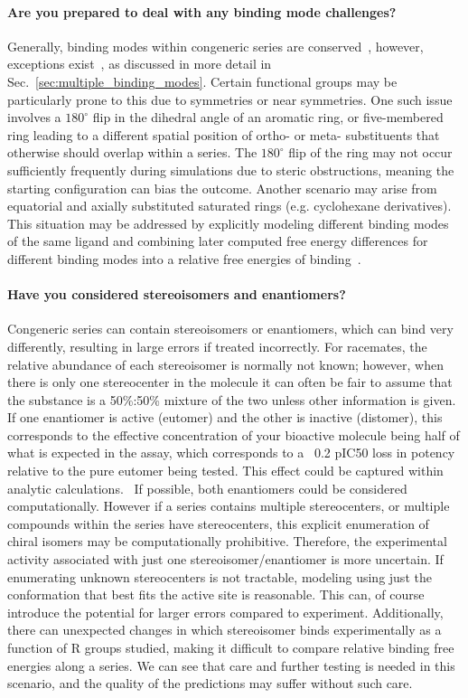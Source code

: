 \documentclass[9pt,bestpractices]{livecoms}
\begin{document}
\paragraph{Are you prepared to deal with any binding mode challenges?}
Generally, binding modes within congeneric series are conserved~\cite{wacker2010conserved}, however, exceptions exist~\cite{brandt2011congeneric,nazare2005probing}, as discussed in more detail in Sec.~\ref{sec:multiple_binding_modes}. Certain functional groups may be particularly prone to this due to symmetries or near symmetries. One such issue involves a $180^{\circ}$ flip in the dihedral angle of an aromatic ring, or five-membered ring leading to a different spatial position of ortho- or meta- substituents that otherwise should overlap within a series. The $180^{\circ}$ flip of the ring may not occur sufficiently frequently during simulations due to steric obstructions, meaning the  starting configuration can bias the outcome. Another scenario may arise from equatorial and axially substituted saturated rings (e.g. cyclohexane derivatives). This situation may be addressed by explicitly modeling different binding modes of the same ligand and combining later computed free energy differences for different binding modes into a relative free energies of binding~\cite{kaus2015how}.

\paragraph{Have you considered stereoisomers and enantiomers?}
Congeneric series can contain stereoisomers or enantiomers, which can bind very differently, resulting in large errors if treated incorrectly. For racemates, the relative abundance of each stereoisomer is normally not known; however, when there is only one stereocenter in the molecule it can often be fair to assume that the substance is a 50\%:50\% mixture of the two unless other information is given. If one enantiomer is active (eutomer) and the other is inactive (distomer), this corresponds to the effective concentration of your bioactive molecule being half of what is expected in the assay, which corresponds to a ~0.2 pIC50 loss in potency relative to the pure eutomer being tested. This effect could be captured within analytic calculations.~\cite{h2011significance} If possible, both enantiomers could be considered computationally. However if a series contains multiple stereocenters, or multiple compounds within the series have stereocenters, this explicit enumeration of chiral isomers may be computationally prohibitive. Therefore, the experimental activity associated with just one stereoisomer/enantiomer is more uncertain. If enumerating unknown stereocenters is not tractable, modeling using just the conformation that best fits the active site is reasonable.  This can, of course introduce the potential for larger errors compared to experiment. Additionally, there can unexpected changes in which stereoisomer binds experimentally as a function of R groups studied, making it difficult to compare relative binding free energies along a series. We can see that care and further testing is needed in this scenario, and the quality of the predictions may suffer without such care. 
\end{document}
